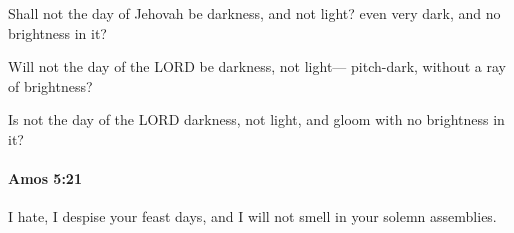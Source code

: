 			\begin{versebox}
					\item[BHS] 
					\item[LXX] 
					\item[ASV] Shall not the day of Jehovah be darkness, and not light? even very dark, and no brightness in it?
					\item[NIV] Will not the day of the LORD be darkness, not light— pitch-dark, without a ray of brightness?
					\item[NRSV] Is not the day of the LORD darkness, not light, and gloom with no brightness in it?
			\end{versebox}

		\paragraph{Amos 5:21} %
			\label{AMOS-5-21}

			I hate, I despise your feast days, and I will not smell in your solemn assemblies.

